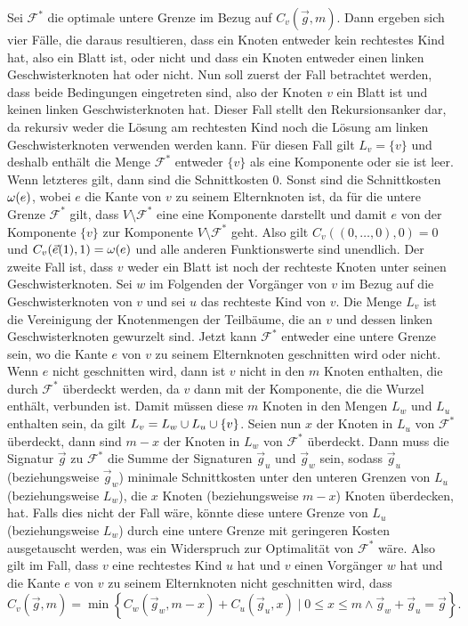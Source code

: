 Sei $\mathcal{F}^*$ die optimale untere Grenze im Bezug auf $C_v(\vec{g}, m)$. Dann ergeben sich vier Fälle, die daraus resultieren, dass ein Knoten entweder kein rechtestes Kind hat, also ein Blatt ist, oder nicht und dass ein Knoten entweder einen linken Geschwisterknoten hat oder nicht.
Nun soll zuerst der Fall betrachtet werden, dass beide Bedingungen eingetreten sind, also der Knoten $v$ ein Blatt ist und keinen linken Geschwisterknoten hat.
Dieser Fall stellt den Rekursionsanker dar, da rekursiv weder die Lösung am rechtesten Kind noch die Lösung am linken Geschwisterknoten verwenden werden kann.
Für diesen Fall gilt $L_v = \{v\}$ und deshalb enthält die Menge $\mathcal{F}^*$ entweder $\{v\}$ als eine Komponente oder sie ist leer.
Wenn letzteres gilt, dann sind die Schnittkosten $0$.
Sonst sind die Schnittkosten $\omega(e)$, wobei $e$ die Kante von $v$ zu seinem Elternknoten ist, da für die untere Grenze $\mathcal{F}^*$ gilt, dass $V \setminus \mathcal{F}^*$ eine eine Komponente darstellt und damit $e$ von der Komponente $\{v\}$ zur Komponente $V \setminus \mathcal{F}^*$ geht.
Also gilt $C_v((0,\ldots,0), 0) = 0$ und $C_v(\vec{e}(1), 1) = \omega(e)$ und alle anderen Funktionswerte sind unendlich.
Der zweite Fall ist, dass $v$ weder ein Blatt ist noch der rechteste Knoten unter seinen Geschwisterknoten. Sei $w$ im Folgenden der Vorgänger von $v$ im Bezug auf die Geschwisterknoten von $v$ und sei $u$ das rechteste Kind von $v$. 
Die Menge $L_v$ ist die Vereinigung der Knotenmengen der Teilbäume, die an $v$ und dessen linken Geschwisterknoten gewurzelt sind.
Jetzt kann $\mathcal{F}^*$ entweder eine untere Grenze sein, wo die Kante $e$ von $v$ zu seinem Elternknoten geschnitten wird oder nicht.
Wenn $e$ nicht geschnitten wird, dann ist $v$ nicht in den $m$ Knoten enthalten, die durch $\mathcal{F}^*$ überdeckt werden, da $v$ dann mit der Komponente, die die Wurzel enthält, verbunden ist.
Damit müssen diese $m$ Knoten in den Mengen $L_w$ und $L_u$ enthalten sein, da gilt $L_v = L_w \cup L_u \cup \{v\}$.
Seien nun $x$ der Knoten in $L_u$ von $\mathcal{F}^*$ überdeckt, dann sind $m - x$ der Knoten in $L_w$ von $\mathcal{F}^*$ überdeckt.
Dann muss die Signatur $\vec{g}$ zu $\mathcal{F}^*$ die Summe der Signaturen $\vec{g}_u$ und $\vec{g}_w$ sein, sodass $\vec{g}_u$ (beziehungsweise $\vec{g}_w$) minimale Schnittkosten unter den unteren Grenzen von $L_u$ (beziehungsweise $L_w$), die $x$ Knoten (beziehungsweise $m - x$) Knoten überdecken, hat.
Falls dies nicht der Fall wäre, könnte diese untere Grenze von $L_u$ (beziehungsweise $L_w$) durch eine untere Grenze mit geringeren Kosten ausgetauscht werden, was ein Widerspruch zur Optimalität von $\mathcal{F}^*$ wäre.
Also gilt im Fall, dass $v$ eine rechtestes Kind $u$ hat und $v$ einen Vorgänger $w$ hat und die Kante $e$ von $v$ zu seinem Elternknoten nicht geschnitten wird, dass 
\begin{equation} \label{eq:e_not_cut}
    C_v(\vec{g}, m) = \min \left\{ C_w(\vec{g}_w, m - x) + C_u(\vec{g}_u, x) \mid 0 \leq x \leq m \land \vec{g}_w + \vec{g}_u = \vec{g} \right\}.
\end{equation}


